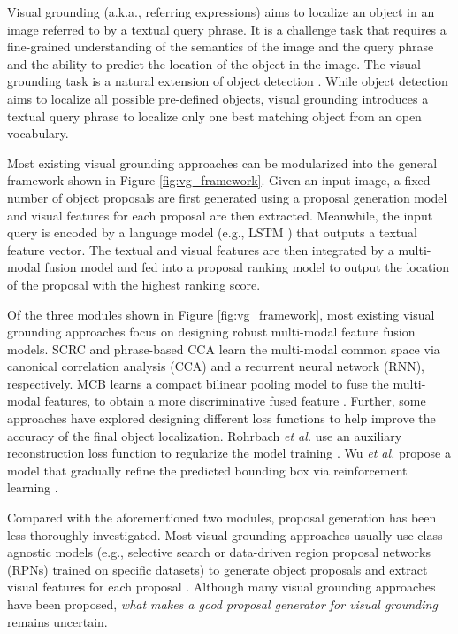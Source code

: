 \documentclass{article}
\begin{document}
Visual grounding (a.k.a., referring expressions) aims to localize an object in an image referred to by a textual query phrase. It is a challenge task that requires a fine-grained understanding of the semantics of the image and the query phrase and the ability to predict the location of the object in the image. The visual grounding task is a natural extension of object detection \cite{ren2015faster}. While object detection aims to localize all possible pre-defined objects, visual grounding introduces a textual query phrase to localize only one best matching object from an open vocabulary.

Most existing visual grounding approaches \cite{rohrbach2016grounding,fukui2016multimodal,hu2016natural} can be modularized into the general framework shown in Figure \ref{fig:vg_framework}. Given an input image, a fixed number of object proposals are first generated using a proposal generation model and visual features for each proposal are then extracted. Meanwhile, the input query is encoded by a language model (e.g., LSTM \cite{hochreiter1997long}) that outputs a textual feature vector. The textual and visual features are then integrated by a multi-modal fusion model and fed into a proposal ranking model to output the location of the proposal with the highest ranking score.

Of the three modules shown in Figure \ref{fig:vg_framework}, most existing visual grounding approaches focus on designing robust multi-modal feature fusion models. SCRC \cite{hu2016natural} and phrase-based CCA \cite{plummer2015flickr30k} learn the multi-modal common space via canonical correlation analysis (CCA) and a recurrent neural network (RNN), respectively. MCB learns a compact bilinear pooling model to fuse the multi-modal features, to obtain a more discriminative fused feature \cite{fukui2016multimodal}. Further, some approaches have explored designing different loss functions to help improve the accuracy of the final object localization. Rohrbach \emph{et al.} use an auxiliary reconstruction loss function to regularize the model training \cite{rohrbach2016grounding}. Wu \emph{et al.} propose a model that gradually refine the predicted bounding box via reinforcement learning \cite{wu2017end}.

Compared with the aforementioned two modules, proposal generation has been less thoroughly investigated. Most visual grounding approaches usually use class-agnostic models (e.g., selective search \cite{uijlings2013selective} or data-driven region proposal networks (RPNs) \cite{ren2015faster} trained on specific datasets) to generate object proposals and extract visual features for each proposal \cite{fukui2016multimodal,hu2016natural,rohrbach2016grounding,chen2017query,li2017deep}. Although many visual grounding approaches have been proposed, \emph{what makes a good proposal generator for visual grounding} remains uncertain.
\end{document}
